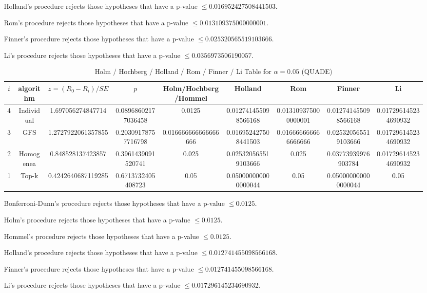 \documentclass[a4paper,10pt]{article}
\begin{document}
\begin{landscape}
Holland's procedure rejects those hypotheses that have a p-value $\le0.016952427508441503$.


Rom's procedure rejects those hypotheses that have a p-value $\le0.013109375000000001$.


Finner's procedure rejects those hypotheses that have a p-value $\le0.025320565519103666$.


Li's procedure rejects those hypotheses that have a p-value $\le0.0356973506190057$.



\newpage

\begin{table}[!htp]
\centering\scriptsize
\caption{Holm / Hochberg / Holland / Rom / Finner / Li Table for $\alpha=0.05$ (QUADE)}
\begin{tabular}{ccccccccc}
$i$&algorithm&$z=(R_0 - R_i)/SE$&$p$&Holm/Hochberg/Hommel&Holland&Rom&Finner&Li\\
\hline
4&Individual&1.697056274847714&0.08968602177036458&0.0125&0.012741455098566168&0.013109375000000001&0.012741455098566168&0.017296145234690932\\
3&GFS&1.2727922061357855&0.20309178757716798&0.016666666666666666&0.016952427508441503&0.016666666666666666&0.025320565519103666&0.017296145234690932\\
2&Homogenea&0.848528137423857&0.3961439091520741&0.025&0.025320565519103666&0.025&0.03773939976903784&0.017296145234690932\\
1&Top-k&0.4242640687119285&0.6713732405408723&0.05&0.050000000000000044&0.05&0.050000000000000044&0.05\\
\hline
\end{tabular}
\end{table}
Bonferroni-Dunn's procedure rejects those hypotheses that have a p-value $\le0.0125$.


Holm's procedure rejects those hypotheses that have a p-value $\le0.0125$.


Hommel's procedure rejects those hypotheses that have a p-value $\le0.0125$.


Holland's procedure rejects those hypotheses that have a p-value $\le0.012741455098566168$.


Finner's procedure rejects those hypotheses that have a p-value $\le0.012741455098566168$.


Li's procedure rejects those hypotheses that have a p-value $\le0.017296145234690932$.



\newpage


\end{landscape}
\end{document}
